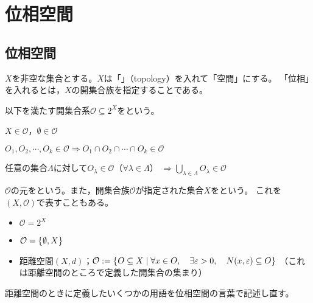 \documentclass[uplatex]{jsarticle}
\begin{document}
\fi

\section{位相空間}
\subsection{位相空間}

$X$を非空な集合とする。$X$は「」（topology）を入れて「空間」にする。
「位相」を入れるとは，$X$の開集合族を指定することである。

\begin{teigi}
  以下を満たす開集合系$\mathcal{O} \subseteq 2^{X}$をという。

   $X \in \mathcal{O}$，$\emptyset \in \mathcal{O}$

   $O_{1}, O_{2}, \cdots, O_{k} \in \mathcal{O} \Longrightarrow O_{1} \cap O_{2} \cap \cdots \cap O_{k} \in \mathcal{O}$

   任意の集合$\Lambda$に対して$O_{\lambda} \in \mathcal{O}$（$\forall \lambda \in \Lambda$） ${\displaystyle \Longrightarrow \bigcup_{\lambda \in \Lambda} O_{\lambda} \in \mathcal{O}}$

  $\mathcal{O}$の元をという。また，開集合族$\mathcal{O}$が指定された集合$X$をという。
  これを$(X,\mathcal{O})$で表すこともある。
\end{teigi}

\begin{rei}
  \begin{itemize}
    \item {} $\mathcal{O} = 2^{X}$
    \item {} $\mathcal{O} = \Set{\hspace{-1.8pt} \emptyset, X \hspace{-1.8pt}}$
    \item 距離空間$(X,d)$；$\mathcal{O} := \Set{\hspace{-1.8pt} O \subseteq X | \forall x \in O, \quad \exists \varepsilon > 0, \quad N(x, \varepsilon) \subseteq O \hspace{-1.8pt}}$
    （これは距離空間のところで定義した開集合の集まり）
  \end{itemize}
\end{rei}

距離空間のときに定義したいくつかの用語を位相空間の言葉で記述し直す。
\end{document}
